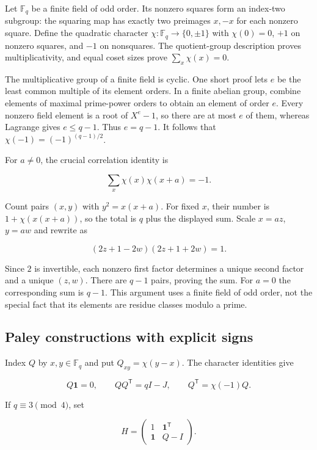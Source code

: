 \documentclass[
  11pt,
]{article}
\begin{document}
Let \(\mathbb F_q\) be a finite field of odd order. Its nonzero squares
form an index-two subgroup: the squaring map has exactly two preimages
\(x,-x\) for each nonzero square. Define the quadratic character
\(\chi:\mathbb F_q\to\{0,\pm1\}\) with \(\chi(0)=0\), \(+1\) on nonzero
squares, and \(-1\) on nonsquares. The quotient-group description proves
multiplicativity, and equal coset sizes prove \(\sum_x\chi(x)=0\).

The multiplicative group of a finite field is cyclic. One short proof
lets \(e\) be the least common multiple of its element orders. In a
finite abelian group, combine elements of maximal prime-power orders to
obtain an element of order \(e\). Every nonzero field element is a root
of \(X^e-1\), so there are at most \(e\) of them, whereas Lagrange gives
\(e\le q-1\). Thus \(e=q-1\). It follows that
\(\chi(-1)=(-1)^{(q-1)/2}\).

For \(a\ne0\), the crucial correlation identity is

\[\sum_x\chi(x)\chi(x+a)=-1.\]

Count pairs \((x,y)\) with \(y^2=x(x+a)\). For fixed \(x\), their number
is \(1+\chi(x(x+a))\), so the total is \(q\) plus the displayed sum.
Scale \(x=az\), \(y=aw\) and rewrite as

\[(2z+1-2w)(2z+1+2w)=1.\]

Since \(2\) is invertible, each nonzero first factor determines a unique
second factor and a unique \((z,w)\). There are \(q-1\) pairs, proving
the sum. For \(a=0\) the corresponding sum is \(q-1\). This argument
uses a finite field of odd order, not the special fact that its elements
are residue classes modulo a prime.

\subsection{Paley constructions with explicit
signs}\label{paley-constructions-with-explicit-signs}

Index \(Q\) by \(x,y\in\mathbb F_q\) and put \(Q_{xy}=\chi(y-x)\). The
character identities give

\[Q\mathbf1=0,\qquad QQ^{\mathsf T}=qI-J,
\qquad Q^{\mathsf T}=\chi(-1)Q.\]

If \(q\equiv3\pmod4\), set

\[H=\begin{pmatrix}1&\mathbf1^{\mathsf T}\\
\mathbf1&Q-I\end{pmatrix}.\]
\end{document}
